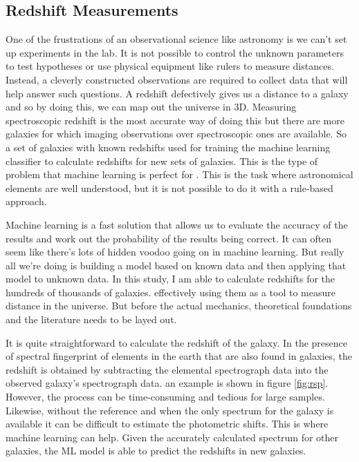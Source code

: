 \subsection{Redshift Measurements}
One of the frustrations of an observational science like astronomy is we can't set up experiments in the lab. It is not possible to control the unknown parameters to test hypotheses or use physical equipment like rulers to measure distances. Instead, a cleverly constructed observations are required to collect data that will help answer such questions. A redshift defectively gives us a distance to a galaxy and so by doing this, we can map out the universe in 3D\parencite{filippenko_great_2007}. Measuring spectroscopic redshift is the most accurate way of doing this but there are more galaxies for which imaging observations over spectroscopic ones are available. So a set of galaxies with known redshifts used for training the machine learning classifier to calculate redshifts for new sets of galaxies. This is the type of problem that machine learning is perfect for \parencite{ivezic_statistics_2014, way_advances_2012}. This is the task where astronomical elements are well understood, but it is not possible to do it with a rule-based approach.

Machine learning is a fast solution that allows us to evaluate the accuracy of the results and work out the probability of the results being correct. It can often seem like there's lots of hidden voodoo going on in machine learning. But really all we're doing is building a model based on known data and then applying that model to unknown data. In this study, I am able to calculate redshifts for the hundreds of thousands of galaxies. effectively using them as a tool to measure distance in the universe. But before the actual mechanics, theoretical foundations and the literature needs to be layed out.
 
 It is quite straightforward to calculate the redshift of the galaxy. In the presence of spectral fingerprint of elements in the earth that are also found in galaxies, the redshift is obtained by subtracting the elemental spectrograph data into the observed galaxy's spectrograph data. an example is shown in figure \ref{fig:rsp}. However, the process can be time-consuming and tedious for large samples. Likewise, without the reference and when the only spectrum for the galaxy is available it can be difficult to estimate the photometric shifts. This is where machine learning can help. Given the accurately calculated spectrum for other galaxies, the ML model is able to predict the redshifts in new galaxies.


